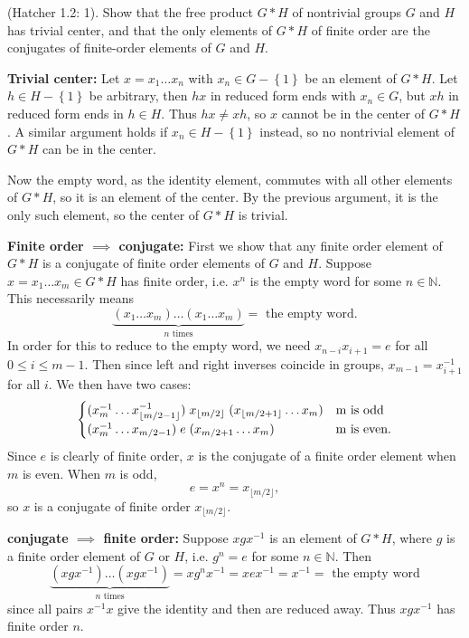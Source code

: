 \documentclass[twoside,10pt]{article}
\begin{document}

\begin{exer}
	(Hatcher 1.2: 1). Show that the free product $G * H$ of nontrivial groups $G$ and $H$ has trivial center, and that the only elements of $G * H$ of finite order are the conjugates of finite-order elements of $G$ and $H$.
\end{exer}

\textbf{Trivial center:} Let $x = x_1\dots x_{n}$ with $x_{n} \in G - \left\{ 1 \right\}$ be an element of $G * H$. Let $h \in H - \left\{ 1 \right\}$ be arbitrary, then $hx$ in reduced form ends with $x_n \in G$, but $xh$ in reduced form ends in $h \in H$. Thus $hx \neq xh$, so $x$ cannot be in the center of $G * H$. A similar argument holds if $x_{n} \in H- \left\{ 1 \right\}$ instead, so no nontrivial element of $G * H$ can be in the center.

Now the empty word, as the identity element, commutes with all other elements of $G * H$, so it is an element of the center. By the previous argument, it is the only such element, so the center of $G * H$ is trivial.

\textbf{Finite order $\implies$ conjugate:} First we show that any finite order element of $G * H$ is a conjugate of finite order elements of $G$ and $H$. Suppose $x = x_1 \dots x_m \in G * H$ has finite order, i.e. $x^{n}$ is the empty word for some $n \in \mathbb{N}$. This necessarily means 
\[
	\underbrace{(x_1\dots x_m)\dots(x_1 \dots x_m)}_{n \text{ times}} = \text{ the empty word}.
\] In order for this to reduce to the empty word, we need $x_{n-i} x_{i+1}=e$ for all $0 \leq i \leq m-1$. Then since left and right inverses coincide in groups, $x_{m-1} = x_{i+1}^{-1}$ for all $i$. We then have two cases:
\[
\begin{cases}
	(x_m^{-1} \dots x_{\lfloor m/2-1 \rfloor}^{-1}) \;x_{\lfloor m/2 \rfloor}\; (x_{\lfloor m/2+1 \rfloor} \dots x_{m}) & $m$ \text{ is odd} \\
	(x_m^{-1} \dots x_{m/2-1}) \;e\; (x_{m/2+1} \dots x_{m}) & $m$ \text{ is even}.
\end{cases}
\] 
Since $e$ is clearly of finite order, $x$ is the conjugate of a finite order element when $m$ is even. When $m$ is odd,
\[
e = x^{n} = x_{\lfloor m/2 \rfloor},
\] so $x$ is a conjugate of finite order $x_{\lfloor m/2 \rfloor}$.

\textbf{conjugate $\implies$ finite order:} Suppose $x g x^{-1}$ is an element of $G * H$, where $g$ is a finite order element of $G$ or $H$, i.e. $g^{n}=e$ for some $n \in \mathbb{N}$. Then
\[
	\underbrace{(xgx^{-1}) \dots (xgx^{-1})}_{n \text{ times}} = xg^{n}x^{-1} = xex^{-1} = x^{-1} = \text{ the empty word}
\] since all pairs $x^{-1}x$ give the identity and then are reduced away. Thus $xgx^{-1}$ has finite order $n$.
\end{document}
